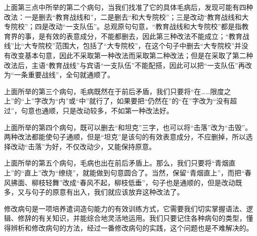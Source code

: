 上面第三点中所举的第二个病句，当我们找准了它的具体毛病后，发现可能有四种改法：一是删去“教育战线和”，二是删去“和大专院校”；三是改动“教育战线和大专院校”；四是改动“一支队伍”。总观原句句意，“教育战线和大专院校”都是指教育界的事，是有效的表意成分，不能都删去，因此第三种改法不能成立；“教育战线”比“大专院校”范围大，包括了“大专院校”，在这个句子中删去“大专院校”并没有改变基本句意，因此不采取第一种改法而采取第二种改法；但是在采取了第二种改法后，主语“教育战线”与宾语“一支队伍”不能配搭，因此可以把“一支队伍”再改为“一条重要战线”，全句就通顺了。

上面所举的第三个病句，毛病既然在于前后矛盾，我们只要将“在……限度之上”的“上”字改为“内”或“中”就行了，如果要把“仍然在”的“在”字改为“没有超过”，句意也通顺，只是改动较多，不如第一种改法好。

上面所举的第四个病句，既可以删去“和坦克”三字，也可以将“击落”改为“击毁”。两种改法都能使句子通顺，但是“坦克”是该句的有效表意成分，不应删掉，所以选择改动“击落”为好，不仅改动少，又能保持原意。

上面所举的第五个病句，毛病也出在前后矛盾上。那么，我们只要将“青烟直上”的“直上”改为“缭绕”，就能做到句意圆合了。当然，保留“青烟直上”，而把“春风拂面、柳枝轻舞”改成“春风不起，柳枝低垂”，句子也是通顺的，但是改动既多，又与句子的原意有出入，我们就应该放弃这种改法了。

修改病句是一项培养遣词造句能力的有效训练方式，它需要我们切实掌握语法、逻辑、修辞的有关知识，并能综合地灵活地运用。我们只要记住各种病句的类型，懂得辨析和修改病句的方法，经过一番修改病句的实践，这个问题也是不难解决的。
\newpage
